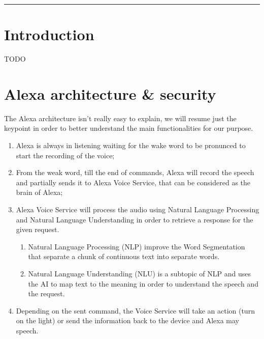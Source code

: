\documentclass[sigconf]{acmart}
\begin{document}


    \begin{teaserfigure}
        \rule{\linewidth}{1mm}
    \end{teaserfigure}

    \maketitle


    \section{Introduction}
    TODO


    \section{Alexa architecture \& security}
    The Alexa architecture isn't really easy to explain, we will resume just the keypoint in order to better understand the main functionalities for our purpose.
    \begin{enumerate}
        \item Alexa is always in listening waiting for the wake word to be pronunced to start the recording of the voice;
        \item From the weak word, till the end of commands, Alexa will record the speech and partially sends it to Alexa Voice Service, that can be considered as the brain of Alexa;
        \item Alexa Voice Service will process the audio using Natural Language Processing and Natural Language Understanding in order to retrieve a response for the given request.
        \begin{enumerate}
            \item Natural Language Processing (NLP) improve the Word Segmentation that separate a chunk of continuous text into separate words.
            \item Natural Language Understanding (NLU) is a subtopic of NLP and uses the AI to map text to the meaning\cite{NLU} in order to understand the speech and the request.
        \end{enumerate}
        \item Depending on the sent command, the Voice Service will take an action (turn on the light) or send the information back to the device and Alexa may speech.
    \end{enumerate}
\end{document}
